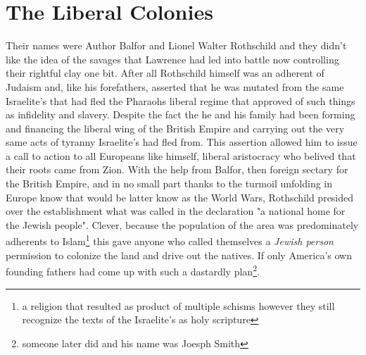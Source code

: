 \documentclass{article}
\begin{document}
\section{The Liberal Colonies}

Their names were Author Balfor and Lionel Walter Rothschild and they didn't like the idea of the savages that Lawrence had led into battle now controlling their rightful clay one bit. After all Rothschild himself was an adherent of Judaism and, like his forefathers, asserted that he was mutated from the same Israelite's that had fled the Pharaohs liberal regime that approved of such things as infidelity and slavery. Despite the fact the he and his family had been forming and financing the liberal wing of the British Empire and carrying out the very same acts of tyranny Israelite's had fled from. This assertion allowed him to issue a call to action to all Europeans like himself, liberal aristocracy who belived that their roots came from Zion. With the help from Balfor, then foreign sectary for the British Empire, and in no small part thanks to the turmoil unfolding in Europe know that would be latter know as the World Wars, Rothschild presided over the establishment what was called in the declaration "a national home for the Jewish people". Clever, because the population of the area was predominately adherents to Islam\footnote{a religion that resulted as product of multiple schisms however they still recognize the texts of the Israelite's as holy scripture} this gave anyone who called themselves a \textit{Jewish person} permission to colonize the land and drive out the natives. If only America's own founding fathers had come up with such a dastardly plan\footnote{someone later did and his name was Joesph Smith}.
\end{document}
